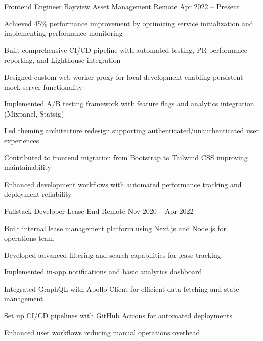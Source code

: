 \documentclass[]{awesome-cv}
\begin{document}
\begin{cventries}
	\cventry
	{Frontend Engineer}
	{Bayview Asset Management}
	{Remote}
	{Apr 2022 – Present}
	{\begin{cvitems}
		\item {Achieved 45\% performance improvement by optimizing service initialization and implementing performance monitoring}
		\item {Built comprehensive CI/CD pipeline with automated testing, PR performance reporting, and Lighthouse integration}
		\item {Designed custom web worker proxy for local development enabling persistent mock server functionality}
		\item {Implemented A/B testing framework with feature flags and analytics integration (Mixpanel, Statsig)}
		\item {Led theming architecture redesign supporting authenticated/unauthenticated user experiences}
		\item {Contributed to frontend migration from Bootstrap to Tailwind CSS improving maintainability}
		\item {Enhanced development workflows with automated performance tracking and deployment reliability}
	\end{cvitems}}
	
	\vspace{3mm}
	
	\cventry
	{Fullstack Developer}
	{Lease End}
	{Remote}
	{Nov 2020 – Apr 2022}
	{\begin{cvitems}
		\item {Built internal lease management platform using Next.js and Node.js for operations team}
		\item {Developed advanced filtering and search capabilities for lease tracking}
		\item {Implemented in-app notifications and basic analytics dashboard}
		\item {Integrated GraphQL with Apollo Client for efficient data fetching and state management}
		\item {Set up CI/CD pipelines with GitHub Actions for automated deployments}
		\item {Enhanced user workflows reducing manual operations overhead}
	\end{cvitems}}
	
	\vspace{3mm}
	

\end{cventries}
\end{document}
